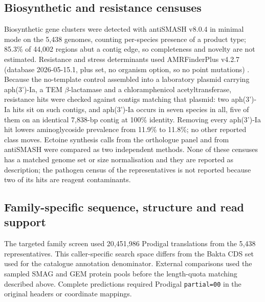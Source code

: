 \documentclass[11pt]{article}
\begin{document}
\subsection*{Biosynthetic and resistance censuses}
Biosynthetic gene clusters were detected with antiSMASH v8.0.4 \citep{blin2025antismash8} in minimal
mode on the 5{,}438 genomes, counting per-species presence of a product type; 85.3\% of 44{,}002
regions abut a contig edge, so completeness and novelty are not estimated. Resistance and stress
determinants used AMRFinderPlus v4.2.7 (database 2026-05-15.1, plus set, no organism option, so no
point mutations) \citep{feldgarden2021amrfinderplus}. Because the no-template control assembled into a
laboratory plasmid carrying aph(3')-Ia, a TEM $\beta$-lactamase and a chloramphenicol
acetyltransferase, resistance hits were checked against contigs matching that plasmid: two
aph(3')-Ia hits sit on such contigs, and aph(3')-Ia occurs in seven species in all, five of them on
an identical 7{,}838-bp contig at 100\% identity. Removing every aph(3')-Ia hit lowers aminoglycoside
prevalence from 11.9\% to 11.8\%; no other reported class moves. Ectoine synthesis calls from the orthologue
panel and from antiSMASH were compared as two independent methods. None of these censuses has a
matched genome set or size normalisation and they are reported as description; the pathogen census
of the representatives is not reported because two of its hits are reagent contaminants.

\subsection*{Family-specific sequence, structure and read support}
The targeted family screen used 20{,}451{,}986 Prodigal translations from the 5{,}438 representatives. This caller-specific search space differs from the Bakta CDS set used for the catalogue annotation denominator. External comparisons used the sampled SMAG and GEM protein pools before the length-quota matching described above. Complete predictions required Prodigal \texttt{partial=00} in the original headers or coordinate mappings.
\end{document}

